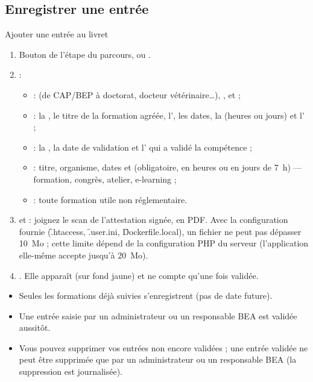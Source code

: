 \documentclass[11pt,a4paper]{article}
\begin{document}
\subsection{Enregistrer une entrée}
\begin{procedure}{Ajouter une entrée au livret}
\begin{enumerate}
  \item Bouton de l'étape du parcours, ou .
  \item {} :
    \begin{itemize}
      \item {} :  (de CAP/BEP à doctorat,
        docteur vétérinaire…), ,
         et  ;
      \item {} : la , le
        titre de la formation agréée, l', les dates, la
         (heures ou jours) et l' ;
      \item {} : la
        , la date de validation et l'
        qui a validé la compétence ;
      \item {} : titre, organisme, dates et
         (obligatoire, en heures ou en jours de 7~h) --- formation,
        congrès, atelier, e-learning ;
      \item {} : toute formation utile non réglementaire.
    \end{itemize}
  \item {} et  : joignez le
    scan de l'attestation signée, en PDF. Avec la configuration fournie
    (\f{.htaccess}, \f{.user.ini}, \f{Dockerfile.local}), un fichier ne peut
    pas dépasser 10~Mo ; cette limite dépend de la configuration PHP du
    serveur (l'application elle-même accepte jusqu'à 20~Mo).
  \item {}. Elle apparaît  (sur fond
    jaune) et ne compte qu'une fois validée.
\end{enumerate}
\end{procedure}

\begin{regle}
\begin{itemize}
  \item Seules les formations déjà suivies s'enregistrent (pas de date
    future).
  \item Une entrée saisie par un administrateur ou un responsable BEA est
    validée aussitôt.
  \item Vous pouvez supprimer vos entrées non encore validées ; une entrée
    validée ne peut être supprimée que par un administrateur ou un
    responsable BEA (la suppression est journalisée).
\end{itemize}
\end{regle}
\end{document}
